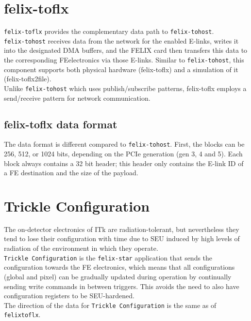 \section{felix-toflx}
\label{sec:felix_toflx}
\texttt{felix-toflx} provides the complementary data path to \texttt{felix-tohost}.\\ \texttt{felix-tohost} receives data from the network for the enabled \acs{E-link}s, writes it into the designated \acs{DMA} buffers, and the \acs{FELIX} card then transfers this data to the corresponding \acl{FE}electronics via those \acs{E-link}s.
Similar to \texttt{felix-tohost}, this component supports both physical hardware (felix-toflx) and a simulation of it (felix-toflx2file).\\
Unlike \texttt{felix-tohost} which uses publish/subscribe patterns, felix-toflx employs a send/receive pattern for network communication.

\subsection{felix-toflx data format}

The data format is different compared to \texttt{felix-tohost}. First, the blocks can be 256, 512, or 1024 bits, depending on the \acs{PCIe} generation (gen 3, 4 and 5). Each block always contains a 32 bit header; this header only contains the \acs{E-link} ID of a \acl{FE} destination and the size of the payload.

\section{Trickle Configuration}

The on-detector electronics of \acf{ITk} are radiation-tolerant, but nevertheless they tend to lose their configuration with time due to \acl{SEU} induced by high levels of radiation \cite{buschmann2019itk} of the environment in which they operate.\\
\texttt{Trickle Configuration} is the \texttt{felix-star} application that sends the configuration towards the \acl{FE} electronics, which means that all configurations (global and pixel) can be gradually updated during operation by continually sending write commands in between triggers. This avoids the need to also have configuration registers to be \acs{SEU}-hardened.\\
The direction of the data for \texttt{Trickle Configuration} is the same as of \texttt{felix\-toflx}.

